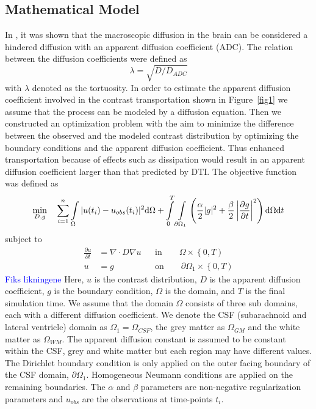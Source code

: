 \documentclass[12pt,a4paper]{article}
\newcommand{\kam}[1]{\textcolor{blue}{#1}}
\begin{document}
\subsection{Mathematical Model}
In \citet{sykova2008diffusion}, it was shown that the macroscopic diffusion in the brain can be considered a hindered diffusion with an apparent diffusion coefficient (ADC). The relation between the diffusion coefficients were defined as 
\begin{equation}
 \lambda =  \sqrt {D/D_{ADC}}
\label{tortuosity}
\end{equation}
with $\lambda$ denoted as the tortuosity.
In order to estimate the apparent diffusion coefficient involved in the contrast transportation shown in Figure~\ref{fig1} we assume that the process can be modeled by a diffusion equation. 
Then we constructed an optimization problem with the aim to minimize the difference between the observed and the modeled contrast distribution by optimizing the boundary conditions and the apparent diffusion coefficient. Thus enhanced transportation because of effects such as dissipation would result in an apparent diffusion coefficient larger than that predicted by DTI. The objective function was defined as 
\begin{equation}
\min_{D,g} \quad \sum\limits_{i=1}\sp{n} \int\limits_{\Omega} |u(t_i) - u_{obs}(t_i)|\sp{2} \mathrm{d}\Omega + \int\limits_{0}\sp{T} \int\limits_{\partial \Omega_1} \left( \frac{\alpha}{2} | g |\sp{2} + \frac{\beta}{2} \left| \frac{\partial g}{\partial t} \right|\sp{2} \right) \mathrm{d}\Omega \mathrm{d}t  
\label{EQ::objf}
\end{equation}
subject to   
\begin{equation}
\begin{aligned}
\frac{\partial u}{\partial t} &= \nabla \cdot  D \nabla u && \text{in} \qquad \Omega \times \left\lbrace 0 , T \right)  \\
u&=g && \text{on} \qquad \partial\Omega_1  \times \left\lbrace 0 , T \right) 
\end{aligned}
\label{Eq::PDE}
\end{equation}
\kam{Fiks likningene}
Here, $u$ is the contrast distribution, $D$ is the apparent diffusion 
coefficient, $g$ is the boundary condition, $\Omega$ is the domain, and $T$ is the final simulation time. We assume that the domain $\Omega$ consists of three sub domains, each with a different diffusion coefficient. We denote the CSF (subarachnoid and lateral ventricle) domain as $\Omega_1=\Omega_{CSF}$, the grey matter as $\Omega_{GM}$ and the white matter as $\Omega_{WM}$. 
The apparent
diffusion constant is assumed to be constant within the CSF, grey and 
white matter but each region may have different values.  
The Dirichlet boundary condition is only applied on the outer facing boundary of the CSF domain, $\partial \Omega_1$. Homogeneous Neumann conditions are applied on the remaining boundaries.
The $\alpha$ and $\beta$ parameters are non-negative regularization parameters 
and $u_{obs}$ are the observations at time-points $t_i$. 
\end{document}
